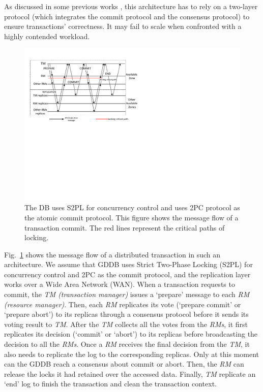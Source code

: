 \documentclass[conference]{IEEEtran}
\begin{document}
As discussed in some previous works \cite{Calvin:conf/sigmod/ThomsonDWRSA12}\cite{Tapir:conf/sosp/ZhangSSKP15}\cite{Janus:conf/osdi/MuNLL16},
this architecture has to rely on a two-layer protocol (which integrates the commit protocol and the consensus protocol) to ensure transactions' correctness.
It may fail to scale when confronted with a highly contended workload.


\begin{figure}[tbp]
  \centerline{\includegraphics[scale=0.50]{figure/message_flow.pdf}}
  \caption
  {
The DB uses S2PL for concurrency control and uses 2PC protocol as the atomic commit protocol.
This figure shows the message flow of a transaction commit.
The red lines represent the critical paths of locking.
    }
\label{fig:message_flow}
\end{figure}

Fig.~\ref{fig:message_flow} shows the message flow of a distributed transaction in such an architecture. We assume that
GDDB uses Strict Two-Phase Locking (S2PL) for concurrency control and 2PC as the commit protocol, and the replication layer works over a Wide Area Network (WAN).
When a transaction requests to commit, the \emph{TM (transaction manager)} issues a `prepare' message to each \emph{RM (resource manager)}.
Then, each \emph{RM} replicates its vote (`prepare commit' or `prepare abort') to its replicas through a consensus protocol before it
sends its voting result to \emph{TM}.
After the \emph{TM} collects all the votes from the \emph{RMs}, it first replicates its decision (`commit' or `abort') to its replicas before broadcasting the decision to all the \emph{RMs}.
Once a \emph{RM} receives the final decision from the \emph{TM}, it also needs to replicate the log to the corresponding replicas.
Only at this moment can the GDDB reach a consensus about commit or abort.
Then, the \emph{RM} can release the locks it had retained over the accessed data.
Finally, \emph{TM} replicate an `end' log to finish the transaction and clean the transaction context.
\end{document}
